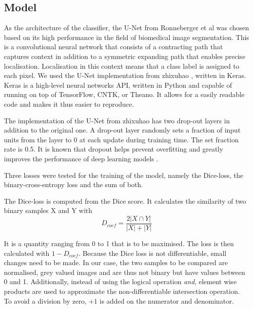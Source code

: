 \begin{sansmath}
\end{sansmath}

\subsection{Model}
As the architecture of the classifier, the U-Net from Ronneberger et al \cite{ronneberger_u-net:_2015} was chosen based on its high performance in the field of biomedical image segmentation.
This is a convolutional neural network that consists of a contracting path that captures context in addition to a symmetric expanding path that enables precise localisation.
Localisation in this context means that a class label is assigned to each pixel.
We used the U-Net implementation from zhixuhao \cite{zhixuhao_zhixuhao/unet_2020}, written in Keras.
Keras is a high-level neural networks API, written in Python and capable of running on top of TensorFlow, CNTK, or Theano.
It allows for a easily readable code and makes it thus easier to reproduce.

The implementation of the U-Net from zhixuhao has two drop-out layers in addition to the original one.
A drop-out layer randomly sets a fraction of input units from the layer to 0 at each update during training time.
The set fraction rate is 0.5.
It is known that dropout helps prevent overfitting and greatly improves the performance of deep learning models \cite{srivastava2014dropout}.

Three losses were tested for the training of the model, namely the Dice-loss, the binary-cross-entropy loss and the sum of both.

The Dice-loss is computed from the Dice score.
It calculates the similarity of two binary samples X and Y with
\begin{equation}\label{eqDcoef}
D_{coef} = \frac{2|X\cap Y|}{|X|+|Y|}   
\end{equation}

It is a quantity ranging from 0 to 1 that is to be maximised.
The loss is then calculated with $1-D_{coef}$.
Because the Dice loss is not differentiable, small changes need to be made.
In our case, the two samples to be compared are normalised, grey valued images  and are thus not binary but have values between 0 and 1. 
Additionally, instead of using the logical operation \textit{and}, element wise products are used to approximate the non-differentiable intersection operation.
To avoid a division by zero, $+1$ is added on the numerator and denominator.

